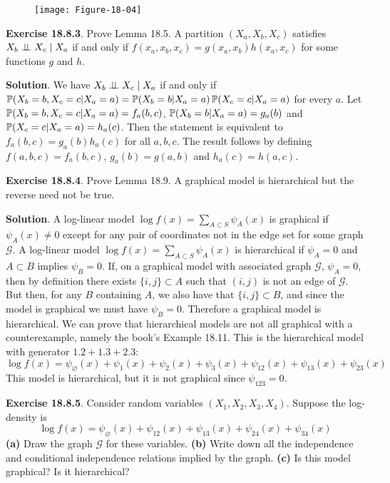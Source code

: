 \begin{figure}[H]
\centering
\texttt{[image: Figure-18-04]}
\end{figure}


\textbf{Exercise 18.8.3}. Prove Lemma 18.5.
A partition \((X_a, X_b, X_c)\) satisfies
\(X_b \perp\!\!\!\perp X_c \; | \; X_a\) if and only if
\(f(x_a, x_b, x_c) = g(x_a, x_b) h(x_a, x_c)\) for some functions \(g\)
and \(h\).

\textbf{Solution}. We have \(X_b \perp\!\!\!\perp X_c \; | \; X_a\) if and
only if
\(\operatorname{\mathbb{P}}(X_b = b, X_c = c | X_a = a) = \operatorname{\mathbb{P}}(X_b = b | X_a = a) \operatorname{\mathbb{P}}(X_c = c | X_a = a)\)
for every \(a\).
Let \(\operatorname{\mathbb{P}}(X_b = b, X_c = c | X_a = a) = f_a(b, c)\),
\(\operatorname{\mathbb{P}}(X_b = b | X_a = a) = g_a(b)\) and
\(\operatorname{\mathbb{P}}(X_c = c | X_a = a) = h_a(c)\). Then the statement is
equivalent to \(f_a(b, c) = g_a(b) h_a(c)\) for all \(a, b, c\). The
result follows by defining \(f(a, b, c) = f_a(b, c)\),
\(g_a(b) = g(a, b)\) and \(h_a(c) = h(a, c)\).

\textbf{Exercise 18.8.4}. Prove Lemma 18.9.
A graphical model is hierarchical but the reverse need not be true.

\textbf{Solution}.
A log-linear model \(\log f(x) = \sum_{A \subset S} \psi_A(x)\) is
graphical if \(\psi_A(x) \neq 0\) except for any pair of coordinates not
in the edge set for some graph \(\mathcal{G}\).
A log-linear model \(\log f(x) = \sum_{A \subset S} \psi_A(x)\) is
hierarchical if \(\psi_A = 0\) and \(A \subset B\) implies
\(\psi_B = 0\).
If, on a graphical model with associated graph \(\mathcal{G}\),
\(\psi_A = 0\), then by definition there exists \(\{ i, j \} \subset A\)
such that \((i, j)\) is not an edge of \(\mathcal{G}\). But then, for
any \(B\) containing \(A\), we also have that \(\{ i, j \} \subset B\),
and since the model is graphical we must have \(\psi_B = 0\). Therefore
a graphical model is hierarchical.
We can prove that hierarchical models are not all graphical with a
counterexample, namely the book's Example 18.11. This is the
hierarchical model with generator \(1.2 + 1.3 + 2.3\):
\[
\log f(x) = \psi_\varnothing(x) + \psi_{1}(x) + \psi_{2}(x) + \psi_{3}(x) + \psi_{12}(x) + \psi_{13}(x) + \psi_{23}(x)
\]
This model is hierarchical, but it is not graphical since
\(\psi_{123} = 0\).

\textbf{Exercise 18.8.5}. Consider random variables
\((X_{1}, X_{2}, X_{3}, X_{4})\). Suppose the log-density is
\[
\log f(x) = \psi_\varnothing(x) + \psi_{12}(x) + \psi_{13}(x) + \psi_{24}(x) + \psi_{34}(x)
\]
\textbf{(a)} Draw the graph \(\mathcal{G}\) for these variables.
\textbf{(b)} Write down all the independence and conditional
independence relations implied by the graph.
\textbf{(c)} Is this model graphical? Is it hierarchical?

